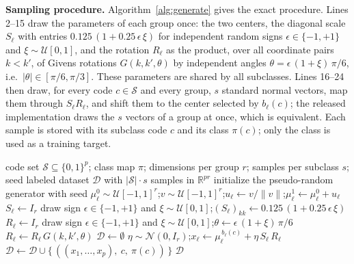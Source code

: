 \documentclass[../ppgc-tese.tex]{subfiles}
\begin{document}
\noindent\textbf{Sampling procedure.}
Algorithm~\ref{alg:generate} gives the exact procedure. Lines 2--15 draw the parameters of each group once: the two centers, the diagonal scale $S_\ell$ with entries $0.125\,(1 + 0.25\,\epsilon\,\xi)$ for independent random signs $\epsilon \in \{-1, +1\}$ and $\xi \sim \mathcal{U}[0,1]$, and the rotation $R_\ell$ as the product, over all coordinate pairs $k < k'$, of Givens rotations $G(k, k', \theta)$ by independent angles $\theta = \epsilon\,(1 + \xi)\,\pi/6$, i.e.\ $|\theta| \in [\pi/6, \pi/3]$. These parameters are shared by all subclasses. Lines 16--24 then draw, for every code $c \in \mathcal{S}$ and every group, $s$ standard normal vectors, map them through $S_\ell R_\ell$, and shift them to the center selected by $b_\ell(c)$; the released implementation draws the $s$ vectors of a group at once, which is equivalent. Each sample is stored with its subclass code $c$ and its class $\pi(c)$; only the class is used as a training target.

\begin{algorithm}[ht]
    \caption{Sample generation shared by both datasets.}
    \label{alg:generate}
    \begin{algorithmic}[1]
        \REQUIRE code set $\mathcal{S} \subseteq \{0,1\}^p$; class map $\pi$; dimensions per group $r$; samples per subclass $s$; seed
        \ENSURE labeled dataset $\mathcal{D}$ with $|\mathcal{S}| \cdot s$ samples in $\mathbb{R}^{pr}$
        \STATE initialize the pseudo-random generator with seed
            \STATE $\mu_\ell^0 \sim \mathcal{U}[-1,1]^r$;\quad $v \sim \mathcal{U}[-1,1]^r$;\quad $u_\ell \gets v/\|v\|$;\quad $\mu_\ell^1 \gets \mu_\ell^0 + u_\ell$
            \STATE $S_\ell \gets I_r$
                \STATE draw sign $\epsilon \in \{-1,+1\}$ and $\xi \sim \mathcal{U}[0,1]$;\quad $(S_\ell)_{kk} \gets 0.125\,(1 + 0.25\,\epsilon\,\xi)$
            \ENDFOR
            \STATE $R_\ell \gets I_r$
                    \STATE draw sign $\epsilon \in \{-1,+1\}$ and $\xi \sim \mathcal{U}[0,1]$;\quad $\theta \gets \epsilon\,(1 + \xi)\,\pi/6$
                    \STATE $R_\ell \gets R_\ell \, G(k, k', \theta)$ 
                \ENDFOR
            \ENDFOR
        \ENDFOR
        \STATE $\mathcal{D} \gets \emptyset$
                    \STATE $\eta \sim \mathcal{N}(0, I_r)$;\quad $x_\ell \gets \mu_\ell^{\,b_\ell(c)} + \eta\,S_\ell\,R_\ell$
                \ENDFOR
                \STATE $\mathcal{D} \gets \mathcal{D} \cup \{\,((x_1, \dots, x_p),\ c,\ \pi(c))\,\}$
            \ENDFOR
        \ENDFOR
        \RETURN $\mathcal{D}$
    \end{algorithmic}
\end{algorithm}
\end{document}
